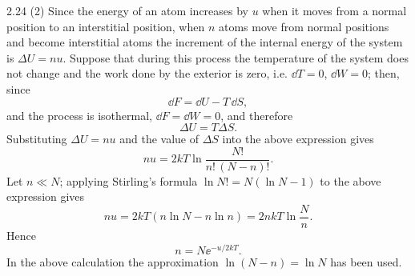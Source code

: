 \begin{solution}{2.24}
(2) Since the energy of an atom increases by $u$ when it moves from a normal position to an
interstitial position, when $n$ atoms move from normal positions and become interstitial atoms
the increment of the internal energy of the system is $\Delta U=nu$. Suppose that during this
process the temperature of the system does not change and the work done by the exterior is zero,
i.e. $\dd T=0$, $\dd W=0$; then, since
\begin{equation*}
\dd F = \dd U - T\,\dd S,
\end{equation*}
and the process is isothermal, $\dd F=\dd W=0$, and therefore
\begin{equation*}
\Delta U = T\Delta S .
\end{equation*}
Substituting $\Delta U=nu$ and the value of $\Delta S$ into the above expression gives
\begin{equation*}
nu = 2kT\ln\frac{N!}{n!\,(N-n)!}.
\end{equation*}
Let $n\ll N$; applying Stirling's formula $\ln N!=N\left(\ln N-1\right)$ to the above expression
gives
\begin{equation*}
nu = 2kT\left(n\ln N-n\ln n\right) = 2nkT\ln\frac{N}{n}.
\end{equation*}
Hence
\begin{equation*}
n = N\ee^{-u/2kT}.
\end{equation*}
In the above calculation the approximation $\ln(N-n)=\ln N$ has been used.
\end{solution}

